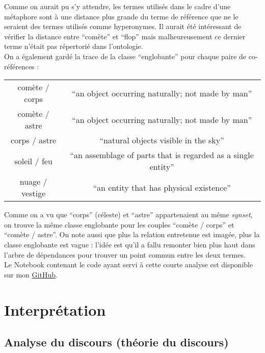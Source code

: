 \documentclass[a4paper,10pt]{article}
\begin{document}
		Comme on aurait pu s'y attendre, les termes utilisés dans le cadre d'une métaphore sont à une distance plus grande du terme de référence que ne le seraient des termes utilisés comme hyperonymes. Il aurait été intéressant de vérifier la distance entre ``comète'' et ``flop'' mais malheureusement ce dernier terme n'était pas répertorié dans l'ontologie.\\
		On a également gardé la trace de la classe ``englobante'' pour chaque paire de co-références :
		\begin{center}
			\begin{tabular}{| c | c |}
				\hline
				comète / corps & ``an object occurring naturally; not made by man'' \\
				comète / astre & ``an object occurring naturally; not made by man'' \\
				corps / astre & ``natural objects visible in the sky'' \\
				soleil / feu & ``an assemblage of parts that is regarded as a single entity'' \\
				nuage / vestige & ``an entity that has physical existence''\\
				\hline
			\end{tabular}
		\end{center}
		Comme on a vu que ``corps'' (céleste) et ``astre'' appartenaient au même \textit{synset}, on trouve la même classe englobante pour les couples ``comète / corps'' et ``comète / astre''. On note aussi que plus la relation entretenue est imagée, plus la classe englobante est vague : l'idée est qu'il a fallu remonter bien plus haut dans l'arbre de dépendances pour trouver un point commun entre les deux termes.\\
		Le Notebook contenant le code ayant servi à cette courte analyse est disponible sur mon \href{https://github.com/AdeleMortier/semantic_distance}{GitHub}.
\section{Interprétation}
	\subsection{Analyse du discours (théorie du discours)}
\end{document}
